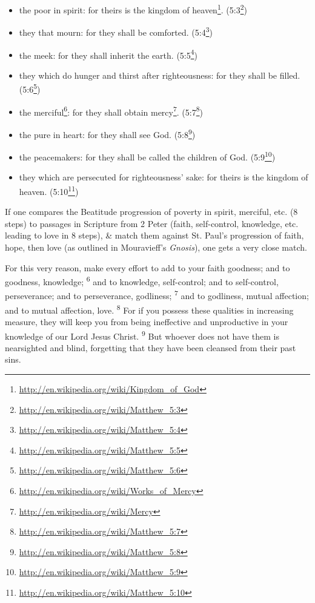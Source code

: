 \begin{itemize}


\item the poor in spirit: for theirs is the kingdom of heaven\footnote{\url{http://en.wikipedia.org/wiki/Kingdom\_of\_God}}. (5:3\footnote{\url{http://en.wikipedia.org/wiki/Matthew\_5:3}})

\item they that mourn: for they shall be comforted. (5:4\footnote{\url{http://en.wikipedia.org/wiki/Matthew\_5:4}})

\item the meek: for they shall inherit the earth. (5:5\footnote{\url{http://en.wikipedia.org/wiki/Matthew\_5:5}})

\item they which do hunger and thirst after righteousness: for they shall be filled. (5:6\footnote{\url{http://en.wikipedia.org/wiki/Matthew\_5:6}})

\item the merciful\footnote{\url{http://en.wikipedia.org/wiki/Works\_of\_Mercy}}: for they shall obtain mercy\footnote{\url{http://en.wikipedia.org/wiki/Mercy}}. (5:7\footnote{\url{http://en.wikipedia.org/wiki/Matthew\_5:7}})

\item the pure in heart: for they shall see God. (5:8\footnote{\url{http://en.wikipedia.org/wiki/Matthew\_5:8}})

\item the peacemakers: for they shall be called the children of God. (5:9\footnote{\url{http://en.wikipedia.org/wiki/Matthew\_5:9}})

\item they which are persecuted for righteousness' sake: for theirs is the kingdom of heaven. (5:10\footnote{\url{http://en.wikipedia.org/wiki/Matthew\_5:10}})
\end{itemize}


If one compares the Beatitude progression of poverty in spirit, merciful, etc. (8 steps) to passages in Scripture from 2 Peter (faith, self-control, knowledge, etc. leading to love in 8 steps), \& match them against St. Paul's progression of faith, hope, then love (as outlined in Mouravieff's \emph{Gnosis}), one gets a very close match.

\begin{quotex}
For this very reason, make every effort to add to your faith goodness; and to goodness, knowledge; \textsuperscript{6} and to knowledge, self-control; and to self-control, perseverance; and to perseverance, godliness; \textsuperscript{7} and to godliness, mutual affection; and to mutual affection, love. \textsuperscript{8} For if you possess these qualities in increasing measure, they will keep you from being ineffective and unproductive in your knowledge of our Lord Jesus Christ.
\textsuperscript{9} But whoever does not have them is nearsighted and blind, forgetting that they have been cleansed from their past sins.
\end{quotex}


